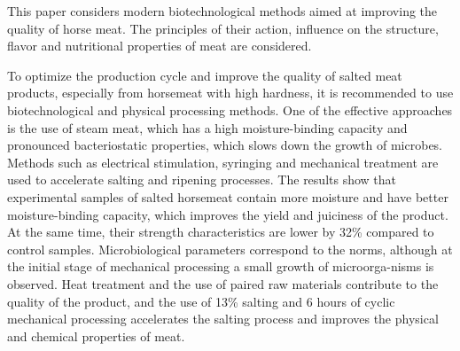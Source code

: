 This paper considers modern biotechnological methods aimed at improving
the quality of horse meat. The principles of their action, influence on
the structure, flavor and nutritional properties of meat are considered.

To optimize the production cycle and improve the quality of salted meat
products, especially from horsemeat with high hardness, it is
recommended to use biotechnological and physical processing methods. One
of the effective approaches is the use of steam meat, which has a high
moisture-binding capacity and pronounced bacteriostatic properties,
which slows down the growth of microbes. Methods such as electrical
stimulation, syringing and mechanical treatment are used to accelerate
salting and ripening processes. The results show that experimental
samples of salted horsemeat contain more moisture and have better
moisture-binding capacity, which improves the yield and juiciness of the
product. At the same time, their strength characteristics are lower by
32\% compared to control samples. Microbiological parameters correspond
to the norms, although at the initial stage of mechanical processing a
small growth of microorga-nisms is observed. Heat treatment and the use
of paired raw materials contribute to the quality of the product, and
the use of 13\% salting and 6 hours of cyclic mechanical processing
accelerates the salting process and improves the physical and chemical
properties of meat.

